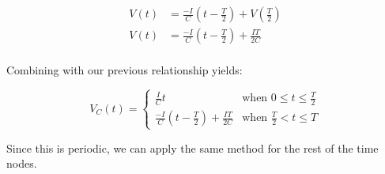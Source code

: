 \begin{enumerate}
{            \begin{align*}
            V(t) &= \frac{-I}{C}\left(t-\frac{T}{2}\right) + V\left(\frac{T}{2}\right) \\
            V(t) &= \frac{-I}{C}\left(t-\frac{T}{2}\right) + \frac{I T}{2C} \\
            \end{align*}
            
            Combining with our previous relationship yields:
            
            \begin{equation*} 
            V_C(t) = 
            \begin{cases}
            	\frac{I}{C}t & \text{when } 0\leq t \leq \frac{T}{2} \\
            	\frac{-I}{C}\left(t-\frac{T}{2}\right) + \frac{I T}{2C}
            	&
            	\text{when }  \frac{T}{2} < t \leq T
            \end{cases}
            \end{equation*}
            
            Since this is periodic, we can apply the same method for the rest of the time nodes.
        
}
\end{enumerate}
